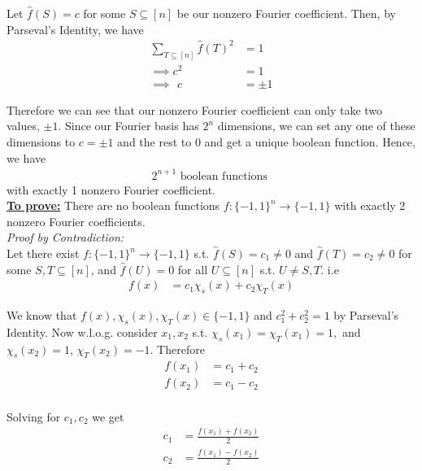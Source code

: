 \documentclass{article}
\begin{document}
Let $\widehat{f}(S) = c$ for some $S \subseteq [n]$ be our nonzero Fourier coefficient. Then, by Parseval's Identity, we have
\begin{align*}
	\sum_{T \subseteq [n]} \widehat{f}(T)^2 &= 1 \\
	\implies c^2 &= 1 \\
	\implies\ \, c &= \pm 1
\end{align*}

\noindent
Therefore we can see that our nonzero Fourier coefficient can only take two values, $\pm 1$. Since our Fourier basis has $2^n$ dimensions, we can set any one of these dimensions to $c = \pm 1$ and the rest to $0$ and get a unique boolean function. Hence, we have 
\begin{align*}
	\boxed{2^{n+1} \text{ boolean functions }}
\end{align*}
with exactly 1 nonzero Fourier coefficient. \\


\noindent
\underline{\textbf{To prove:}} There are no boolean functions $f : {\{-1, 1\}}^n \rightarrow \{-1, 1\}$ with exactly 2 nonzero Fourier coefficients. \\

\noindent 
\textit{Proof by Contradiction:} \\

Let there exist $f : {\{-1, 1\}}^n \rightarrow \{-1, 1\}$ s.t. $\widehat{f}(S) = c_1 \neq 0$ and $\widehat{f}(T) = c_2 \neq 0$ for some $S, T \subseteq [n]$, and $\widehat{f}(U) = 0$ for all $U \subseteq [n]$ s.t. $U \neq S, T$. i.e 
\begin{align*}
	f(x) &= c_1 \chi_s(x) + c_2 \chi_T(x)
\end{align*}

We know that $f(x), \chi_s(x), \chi_T(x) \in \{-1, 1\}$ and $c_1^2 + c_2^2 = 1$ by Parseval's Identity. Now w.l.o.g. consider $x_1, x_2$ s.t. $\chi_s(x_1) = \chi_T(x_1) = 1,$ and $\chi_s(x_2) = 1$, $\chi_T(x_2) = -1$. Therefore
\begin{align*}
	f(x_1) &= c_1 + c_2 \\
	f(x_2) &= c_1 - c_2 \\
\end{align*}

Solving for $c_1, c_2$ we get
\begin{align*}
	c_1 &= \frac{f(x_1) + f(x_2)}{2} \\
	c_2 &= \frac{f(x_1) - f(x_2)}{2} \\
\end{align*}
\end{document}
